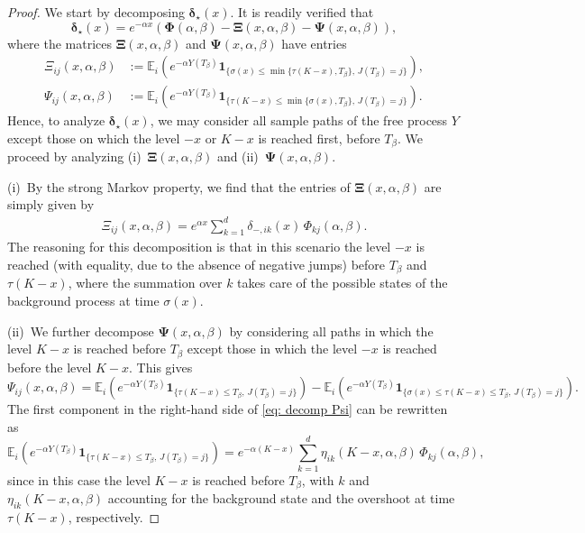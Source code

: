 \documentclass[10pt,a4paper]{amsart}
\newcommand{\bs}{\boldsymbol}
\begin{document}
\begin{proof} 
    We start by decomposing $\bs\delta_\star(x)$. It is readily verified that
   \begin{equation}\label{eq: decomp delta*}
       \bs\delta_\star(x) = e^{-\alpha x}\left(\bs\Phi(\alpha,\beta) - {\bs \Xi}(x,\alpha, \beta) -{\bs \Psi}(x,\alpha, \beta)\right),
   \end{equation}
    where the matrices ${\bs \Xi}(x,\alpha,\beta)$ and ${\bs \Psi}(x,\alpha,\beta)$ have entries
\begin{align*}
    \Xi_{ij}(x,\alpha,\beta)&:= {\mathbb E}_i\left(e^{-\alpha Y(T_{\beta})}{\bs 1}_{\{\sigma(x)\leqslant\min\{\tau(K-x), T_{\beta} \},\,J(T_{\beta})=j\}}\right),\\
    \Psi_{ij}(x,\alpha,\beta)&:= {\mathbb E}_i\left(e^{-\alpha Y(T_{\beta})}{\bs 1}_{\{\tau(K-x)\leqslant\min\{\sigma(x), T_{\beta} \},\,J(T_{\beta})=j\}}\right).
\end{align*}Hence, to analyze $\bs\delta_\star(x)$, we may consider all sample paths of the free process $Y$ except those on which the level $-x$ or $K-x$ is reached first, before $T_\beta$. We proceed by analyzing (i)~${\bs \Xi}(x,\alpha,\beta)$ and (ii)~${\bs \Psi}(x,\alpha,\beta)$.

\medskip
(i)~By the strong Markov property, we find that the entries of ${\bs \Xi}(x,\alpha,\beta)$ are simply given by
\begin{align*}
    \Xi_{ij}(x,\alpha,\beta) = e^{\alpha x}\sum_{k=1}^d \delta_{-,ik}(x)\,{\Phi}_{kj}(\alpha, \beta).
\end{align*}
The reasoning for this decomposition is that in this scenario the level $-x$ is reached (with equality, due to the absence of negative jumps) before $T_{\beta}$ and $\tau(K-x)$, where the summation over $k$ takes care of the possible states of the background process at time $\sigma(x)$.

\medskip
(ii)~We further decompose ${\bs \Psi}(x,\alpha,\beta)$ by considering all paths in which the level $K-x$ is reached before $T_{\beta}$ except those in which the level $-x$ is reached before the level $K-x$. This gives
\begin{equation}\label{eq: decomp Psi}
    {\Psi}_{ij}(x,\alpha,\beta) = {\mathbb E}_i\left(e^{-\alpha Y(T_{\beta})}{\bs 1}_{\{\tau(K-x)\leqslant T_{\beta},\,J(T_{\beta})=j\}}\right) - {\mathbb E}_i\left(e^{-\alpha Y(T_{\beta})}{\bs 1}_{\{\sigma(x)\leqslant\tau(K-x)\leqslant T_{\beta},\,J(T_{\beta})=j\}}\right).
\end{equation}
The first component in the right-hand side of \eqref{eq: decomp Psi} can be rewritten as 
\begin{equation*}
    {\mathbb E}_i\left(e^{-\alpha Y(T_{\beta})}{\bs 1}_{\{\tau(K-x)\leqslant T_{\beta},\,J(T_{\beta})=j\}}\right) = e^{-\alpha(K-x)}\sum_{k=1}^d  \eta_{ik}(K-x, \alpha, \beta)\,\Phi_{kj}(\alpha,\beta),
\end{equation*}
since in this case the level $K-x$ is reached before $T_{\beta}$, with $k$ and $\eta_{ik}(K-x,\alpha,\beta)$ accounting for the background state and the overshoot at time $\tau(K-x)$, respectively.


\end{proof}
\end{document}
